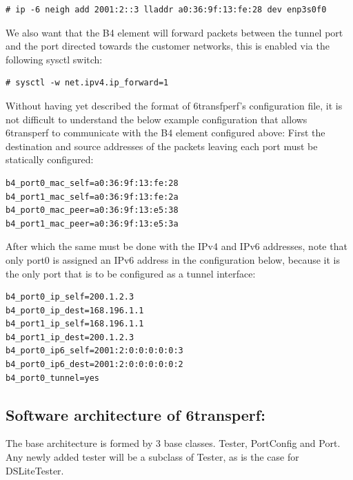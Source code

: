\documentclass[a4paper,12p]{article}
\begin{document}
\begin{lstlisting}
# ip -6 neigh add 2001:2::3 lladdr a0:36:9f:13:fe:28 dev enp3s0f0
\end{lstlisting}

We also want that the B4 element will forward packets between the tunnel port and the port directed towards the customer networks, this is enabled via the following sysctl switch:

\begin{lstlisting}
# sysctl -w net.ipv4.ip_forward=1
\end{lstlisting}

Without having yet described the format of 6transfperf’s configuration file, it is not difficult to understand the below example configuration that allows 6transperf to communicate with the B4 element configured above:
First the destination and source addresses of the packets leaving each port must be statically  configured:

\begin{lstlisting}
b4_port0_mac_self=a0:36:9f:13:fe:28
b4_port1_mac_self=a0:36:9f:13:fe:2a
b4_port0_mac_peer=a0:36:9f:13:e5:38
b4_port1_mac_peer=a0:36:9f:13:e5:3a
\end{lstlisting}

After which the same must be done with the IPv4 and IPv6 addresses, note that only port0 is assigned an IPv6 address in the configuration below, because it is the only port that is to be configured as a tunnel interface:

\begin{lstlisting}
b4_port0_ip_self=200.1.2.3
b4_port0_ip_dest=168.196.1.1
b4_port1_ip_self=168.196.1.1
b4_port1_ip_dest=200.1.2.3
b4_port0_ip6_self=2001:2:0:0:0:0:0:3
b4_port0_ip6_dest=2001:2:0:0:0:0:0:2
b4_port0_tunnel=yes
\end{lstlisting}

\subsection{Software architecture of 6transperf:}
The base architecture is formed by 3 base classes. Tester, PortConfig and Port. Any newly added tester will be a subclass of Tester, as is the case for DSLiteTester.
\end{document}
